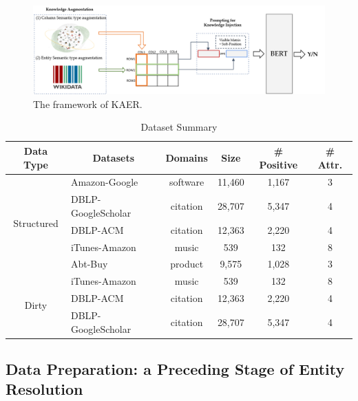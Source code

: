 \begin{figure}
    \centering
    \includegraphics[width=\linewidth]{plots/DCER_framework.png}
    \caption{The framework of KAER.}
    \label{fig:framework}
\end{figure}


\begin{table}[]
\centering
\begin{tabular}{@{}clcccc@{}}
\toprule
\textbf{Data Type} & \multicolumn{1}{c}{\textbf{Datasets}} & \textbf{Domains} & \textbf{Size} & \textbf{\# Positive} & \textbf{\# Attr.} \\ \midrule
\multirow{5}{*}{Structured} & Amazon-Google      & software & 11,460 & 1,167 & 3 \\
                            & DBLP-GoogleScholar & citation & 28,707 & 5,347 & 4 \\
                            & DBLP-ACM           & citation & 12,363 & 2,220 & 4 \\
                            & iTunes-Amazon      & music    & 539    & 132   & 8 \\
                            & Abt-Buy            & product  & 9,575  & 1,028 & 3 \\ \midrule
\multirow{3}{*}{Dirty}      & iTunes-Amazon      & music    & 539    & 132   & 8 \\
                            & DBLP-ACM           & citation & 12,363 & 2,220 & 4 \\
                            & DBLP-GoogleScholar & citation & 28,707 & 5,347 & 4 \\ \bottomrule
\end{tabular}
\caption{Dataset Summary}
\label{tab:dataset_overview}
\end{table}



\subsection{Data Preparation: a Preceding Stage of Entity Resolution}

